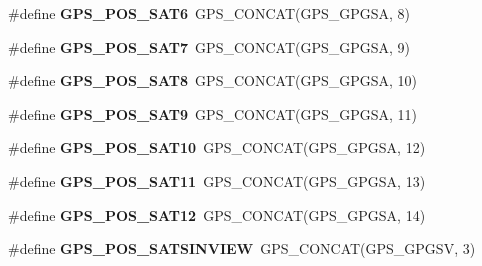 \begin{DoxyCompactItemize}
\item 
\hypertarget{group___t_m___g_p_s___macros_ga0144273a6effe1404346a1104a0ed80f}{}\#define {\bfseries G\+P\+S\+\_\+\+P\+O\+S\+\_\+\+S\+A\+T6}~G\+P\+S\+\_\+\+C\+O\+N\+C\+A\+T(G\+P\+S\+\_\+\+G\+P\+G\+S\+A, 8)\label{group___t_m___g_p_s___macros_ga0144273a6effe1404346a1104a0ed80f}

\item 
\hypertarget{group___t_m___g_p_s___macros_ga2753e457eeb22f7143bfb44026b152be}{}\#define {\bfseries G\+P\+S\+\_\+\+P\+O\+S\+\_\+\+S\+A\+T7}~G\+P\+S\+\_\+\+C\+O\+N\+C\+A\+T(G\+P\+S\+\_\+\+G\+P\+G\+S\+A, 9)\label{group___t_m___g_p_s___macros_ga2753e457eeb22f7143bfb44026b152be}

\item 
\hypertarget{group___t_m___g_p_s___macros_ga3bc4aff3bf6a03258d2d3789a806c055}{}\#define {\bfseries G\+P\+S\+\_\+\+P\+O\+S\+\_\+\+S\+A\+T8}~G\+P\+S\+\_\+\+C\+O\+N\+C\+A\+T(G\+P\+S\+\_\+\+G\+P\+G\+S\+A, 10)\label{group___t_m___g_p_s___macros_ga3bc4aff3bf6a03258d2d3789a806c055}

\item 
\hypertarget{group___t_m___g_p_s___macros_gac0146d8c4eb0f53fd5320f0702262d27}{}\#define {\bfseries G\+P\+S\+\_\+\+P\+O\+S\+\_\+\+S\+A\+T9}~G\+P\+S\+\_\+\+C\+O\+N\+C\+A\+T(G\+P\+S\+\_\+\+G\+P\+G\+S\+A, 11)\label{group___t_m___g_p_s___macros_gac0146d8c4eb0f53fd5320f0702262d27}

\item 
\hypertarget{group___t_m___g_p_s___macros_ga9d74d3fb3c3061e4ef7950d35b612771}{}\#define {\bfseries G\+P\+S\+\_\+\+P\+O\+S\+\_\+\+S\+A\+T10}~G\+P\+S\+\_\+\+C\+O\+N\+C\+A\+T(G\+P\+S\+\_\+\+G\+P\+G\+S\+A, 12)\label{group___t_m___g_p_s___macros_ga9d74d3fb3c3061e4ef7950d35b612771}

\item 
\hypertarget{group___t_m___g_p_s___macros_ga7712a77217ba7b6b9c27c8984278853c}{}\#define {\bfseries G\+P\+S\+\_\+\+P\+O\+S\+\_\+\+S\+A\+T11}~G\+P\+S\+\_\+\+C\+O\+N\+C\+A\+T(G\+P\+S\+\_\+\+G\+P\+G\+S\+A, 13)\label{group___t_m___g_p_s___macros_ga7712a77217ba7b6b9c27c8984278853c}

\item 
\hypertarget{group___t_m___g_p_s___macros_gafc51d50327a324ea23fa838f892579be}{}\#define {\bfseries G\+P\+S\+\_\+\+P\+O\+S\+\_\+\+S\+A\+T12}~G\+P\+S\+\_\+\+C\+O\+N\+C\+A\+T(G\+P\+S\+\_\+\+G\+P\+G\+S\+A, 14)\label{group___t_m___g_p_s___macros_gafc51d50327a324ea23fa838f892579be}

\item 
\hypertarget{group___t_m___g_p_s___macros_ga1db9e7b12d9416e1144793da9e51f5e1}{}\#define {\bfseries G\+P\+S\+\_\+\+P\+O\+S\+\_\+\+S\+A\+T\+S\+I\+N\+V\+I\+E\+W}~G\+P\+S\+\_\+\+C\+O\+N\+C\+A\+T(G\+P\+S\+\_\+\+G\+P\+G\+S\+V, 3)\label{group___t_m___g_p_s___macros_ga1db9e7b12d9416e1144793da9e51f5e1}


\end{DoxyCompactItemize}
